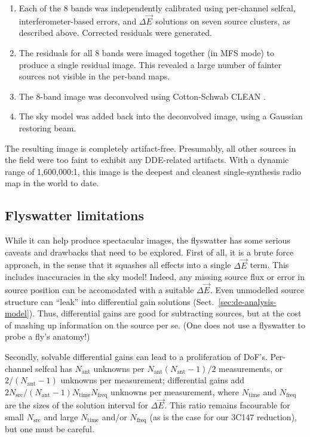 \documentclass[]{aa}
\newcommand{\jones}[2]{\vec {#1}_{#2}}
\begin{document}
\begin{enumerate}

\item Each of the 8 bands was independently calibrated using per-channel selfcal, interferometer-based errors, and $\Delta\jones{E}{}$ solutions on seven source clusters, as described above. Corrected residuals were generated.

\item The residuals for all 8 bands were imaged together (in MFS mode) to produce a single residual image. This revealed a large number of fainter sources not visible in the per-band maps.

\item The 8-band image was deconvolved using Cotton-Schwab CLEAN \citep{Schwab:csclean}.

\item The sky model was added back into the deconvolved image, using a Gaussian restoring beam.

\end{enumerate}

The resulting image is completely artifact-free. Presumably, all other sources in the field were too faint to exhibit any DDE-related artifacts. With a dynamic range of 1,600,000:1, this image is the deepest and cleanest single-synthesis radio map in the world to date. 

\subsection{Flyswatter limitations}

While it can help produce spectacular images, the flyswatter has some serious caveats and drawbacks that need to be explored. First of all, it is a brute force approach, in the sense that it squashes all effects into a single $\Delta\jones{E}{}$ term. This includes inaccuracies in the sky model! Indeed, any missing source flux or error in source position can be accomodated with a suitable $\Delta\jones{E}{}$. Even unmodelled source structure can ``leak'' into differential gain solutions (Sect.~\ref{sec:de-analysis-model}). Thus, differential gains are good for subtracting sources, but at the cost of mashing up information on the source per se. (One does not use a flyswatter to probe a fly's anatomy!)

Secondly, solvable differential gains can lead to a proliferation of DoF's. Per-channel selfcal has $N_\mathrm{ant}$ unknowns per $N_\mathrm{ant}(N_\mathrm{ant}-1)/2$ measurements, or $2/(N_\mathrm{ant}-1)$ unknowns per measurement; differential gains add $2N_\mathrm{src}/(N_\mathrm{ant}-1)N_\mathrm{time}N_\mathrm{freq}$ unknowns per measurement, where $N_\mathrm{time}$ and $N_\mathrm{freq}$ are the sizes of the solution interval for $\Delta\jones{E}{}$. This ratio remains facourable for small $N_\mathrm{src}$ and large $N_\mathrm{time}$ and/or $N_\mathrm{freq}$ (as is the case for our 3C147 reduction), but one must be careful.
\end{document}

